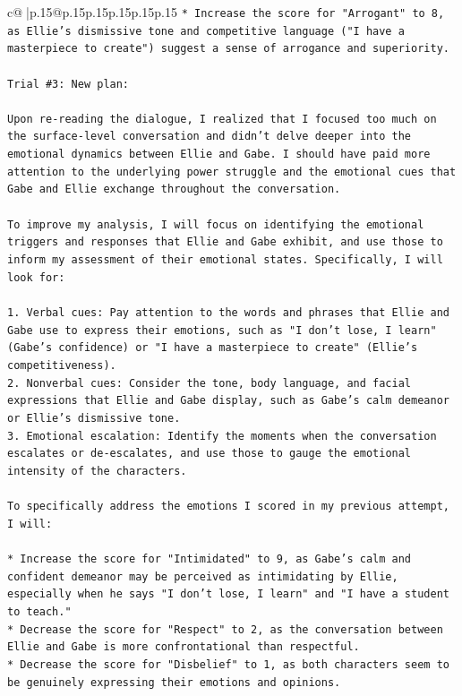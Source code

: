 \documentclass{article}
\begin{document}
{\begin{supertabular}{c@{$\;$}|p{.15\linewidth}@{}p{.15\linewidth}p{.15\linewidth}p{.15\linewidth}p{.15\linewidth}p{.15\linewidth}}
{{{\texttt{* Increase the score for "Arrogant" to 8, as Ellie's dismissive tone and competitive language ("I have a masterpiece to create") suggest a sense of arrogance and superiority.} \\
\\ 
\texttt{Trial \#3: New plan: } \\
\\ 
\texttt{Upon re{-}reading the dialogue, I realized that I focused too much on the surface{-}level conversation and didn't delve deeper into the emotional dynamics between Ellie and Gabe. I should have paid more attention to the underlying power struggle and the emotional cues that Gabe and Ellie exchange throughout the conversation.} \\
\\ 
\texttt{To improve my analysis, I will focus on identifying the emotional triggers and responses that Ellie and Gabe exhibit, and use those to inform my assessment of their emotional states. Specifically, I will look for:} \\
\\ 
\texttt{1. Verbal cues: Pay attention to the words and phrases that Ellie and Gabe use to express their emotions, such as "I don't lose, I learn" (Gabe's confidence) or "I have a masterpiece to create" (Ellie's competitiveness).} \\
\texttt{2. Nonverbal cues: Consider the tone, body language, and facial expressions that Ellie and Gabe display, such as Gabe's calm demeanor or Ellie's dismissive tone.} \\
\texttt{3. Emotional escalation: Identify the moments when the conversation escalates or de{-}escalates, and use those to gauge the emotional intensity of the characters.} \\
\\ 
\texttt{To specifically address the emotions I scored in my previous attempt, I will:} \\
\\ 
\texttt{* Increase the score for "Intimidated" to 9, as Gabe's calm and confident demeanor may be perceived as intimidating by Ellie, especially when he says "I don't lose, I learn" and "I have a student to teach."} \\
\texttt{* Decrease the score for "Respect" to 2, as the conversation between Ellie and Gabe is more confrontational than respectful.} \\
\texttt{* Decrease the score for "Disbelief" to 1, as both characters seem to be genuinely expressing their emotions and opinions.} \\
}}}
\end{supertabular}}
\end{document}

